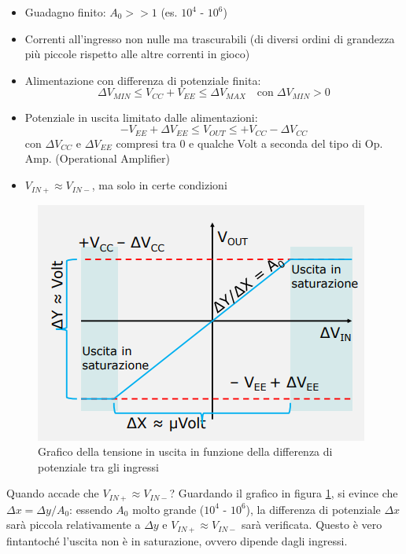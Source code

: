 \documentclass{article}
\begin{document}
\begin{itemize}
  \item Guadagno finito: $A_0 >> 1$ (es. $10^4$ - $10^6$)
  \item Correnti all'ingresso non nulle ma trascurabili (di diversi ordini di grandezza più piccole rispetto alle altre correnti in gioco)
  \item Alimentazione con differenza di potenziale finita:
  \[\Delta V_{MIN} \leq V_{CC} + V_{EE} \leq \Delta V_{MAX} \quad \textrm{con} \; \Delta V_{MIN} > 0\]
  \item Potenziale in uscita limitato dalle alimentazioni:
  \[-V_{EE} + \Delta V_{EE} \leq V_{OUT} \leq + V_{CC} - \Delta V_{CC}\]
  con $\Delta V_{CC}$ e $\Delta V_{EE}$ compresi tra 0 e qualche Volt a seconda del tipo di Op. Amp. (Operational Amplifier)
  \item $V_{IN+} \approx V_{IN-}$, ma solo in certe condizioni
\end{itemize}

\begin{figure}[h]
  \centering
  \includegraphics[scale=0.55]{IM_amplificatore_operazionale_grafico}
  \caption{Grafico della tensione in uscita in funzione della differenza di potenziale tra gli ingressi}
  \label{Schema_amplificatore_operazionale_grafico}
\end{figure}

Quando accade che $V_{IN+} \approx V_{IN-}$? Guardando il grafico in figura \ref{Schema_amplificatore_operazionale_grafico}, si evince che $\Delta x = \Delta y / A_0$: essendo $A_0$ molto grande ($10^4$ - $10^6$), la differenza di potenziale $\Delta x$ sarà piccola relativamente a $\Delta y$ e $V_{IN+} \approx V_{IN-}$ sarà verificata. Questo è vero fintantoché l'uscita non è in saturazione, ovvero dipende dagli ingressi. 
\end{document}
